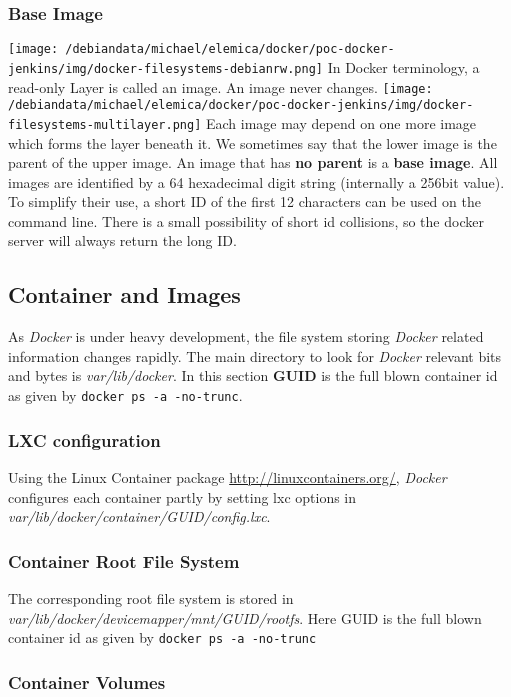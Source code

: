 \documentclass[11pt]{article}
\begin{document}
\subsubsection{Base Image}
\label{sec-2-5-2}

\texttt{[image: /debiandata/michael/elemica/docker/poc-docker-jenkins/img/docker-filesystems-debianrw.png]}
In Docker terminology, a read-only Layer is called an image. An image never changes.
\texttt{[image: /debiandata/michael/elemica/docker/poc-docker-jenkins/img/docker-filesystems-multilayer.png]}
Each image may depend on one more image which forms the layer beneath it. We sometimes say that the lower image is the parent of the upper image. An image that has \textbf{no parent} is a \textbf{base image}.
All images are identified by a 64 hexadecimal digit string (internally a 256bit value). To simplify their use, a short ID of the first 12 characters can be used on the command line. There is a small possibility of short id collisions, so the docker server will always return the long ID.
\subsection{Container and Images}
\label{sec-2-6}

As \emph{Docker} is under heavy development, the file system storing \emph{Docker} related information changes rapidly. The main directory to look for \emph{Docker} relevant bits and bytes is \emph{var/lib/docker}. In this section \textbf{GUID} is the full blown container id as given by \texttt{docker ps -a -no-trunc}.
\subsubsection{LXC configuration}
\label{sec-2-6-1}

Using the Linux Container package \href{file://./lxc/}{http://linuxcontainers.org/}, \emph{Docker} configures each container partly by setting lxc options in \emph{var/lib/docker/container/GUID/config.lxc}. 
\subsubsection{Container Root File System}
\label{sec-2-6-2}

The corresponding root file system is stored in \emph{var/lib/docker/devicemapper/mnt/GUID/rootfs}.
Here GUID is the full blown container id as given by \texttt{docker ps -a -no-trunc}  
\subsubsection{Container Volumes}
\label{sec-2-6-3}
\end{document}
